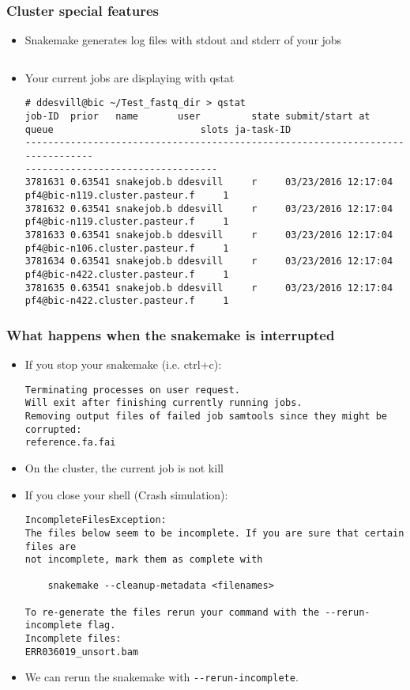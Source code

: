 \documentclass{beamer}
\begin{document}
\begin{frame}[fragile]
    \frametitle{Cluster special features}
    \begin{itemize}
        \item Snakemake generates log files with stdout and stderr of your jobs
            \begin{lstlisting}
            \end{lstlisting}
        \item Your current jobs are displaying with qstat
            \begin{lstlisting}
# ddesvill@bic ~/Test_fastq_dir > qstat
job-ID  prior   name       user         state submit/start at 
queue                          slots ja-task-ID 
-------------------------------------------------------------------------------
----------------------------------
3781631 0.63541 snakejob.b ddesvill     r     03/23/2016 12:17:04 
pf4@bic-n119.cluster.pasteur.f     1        
3781632 0.63541 snakejob.b ddesvill     r     03/23/2016 12:17:04 
pf4@bic-n119.cluster.pasteur.f     1        
3781633 0.63541 snakejob.b ddesvill     r     03/23/2016 12:17:04 
pf4@bic-n106.cluster.pasteur.f     1        
3781634 0.63541 snakejob.b ddesvill     r     03/23/2016 12:17:04 
pf4@bic-n422.cluster.pasteur.f     1        
3781635 0.63541 snakejob.b ddesvill     r     03/23/2016 12:17:04 
pf4@bic-n422.cluster.pasteur.f     1
            \end{lstlisting}
    \end{itemize}
\end{frame}

\begin{frame}[fragile]
    \frametitle{What happens when the snakemake is interrupted}
    \begin{itemize}
        \item If you stop your snakemake (i.e. ctrl+c):
        \begin{lstlisting}[language={}]
Terminating processes on user request.
Will exit after finishing currently running jobs.
Removing output files of failed job samtools since they might be corrupted:
reference.fa.fai
        \end{lstlisting}
        \item On the cluster, the current job is not kill
        \item If you close your shell (Crash simulation):
        \begin{lstlisting}[language={}]
IncompleteFilesException:
The files below seem to be incomplete. If you are sure that certain files are 
not incomplete, mark them as complete with

    snakemake --cleanup-metadata <filenames>

To re-generate the files rerun your command with the --rerun-incomplete flag.
Incomplete files:
ERR036019_unsort.bam
        \end{lstlisting}
        \item We can rerun the snakemake with \lstinline[basicstyle=\small\ttfamily]{--rerun-incomplete}.
    \end{itemize}
\end{frame}
\end{document}
